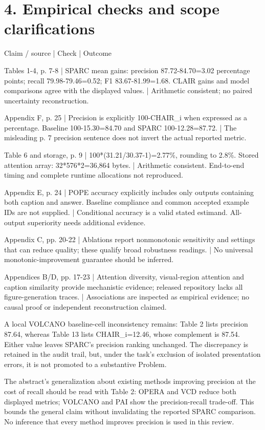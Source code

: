 \documentclass[10pt]{article}
\begin{document}
\section*{4. Empirical checks and scope clarifications}
Claim / source | Check | Outcome\par
Tables 1-4, p. 7-8 | SPARC mean gains: precision 87.72-84.70=3.02 percentage points; recall 79.98-79.46=0.52; F1 83.67-81.99=1.68. CLAIR gains and model comparisons agree with the displayed values. | Arithmetic consistent; no paired uncertainty reconstruction.\par
Appendix F, p. 25 | Precision is explicitly 100-CHAIR\_i when expressed as a percentage. Baseline 100-15.30=84.70 and SPARC 100-12.28=87.72. | The misleading p. 7 precision sentence does not invert the actual reported metric.\par
Table 6 and storage, p. 9 | 100*(31.21/30.37-1)=2.77\%, rounding to 2.8\%. Stored attention array: 32*576*2=36,864 bytes. | Arithmetic consistent. End-to-end timing and complete runtime allocations not reproduced.\par
Appendix E, p. 24 | POPE accuracy explicitly includes only outputs containing both caption and answer. Baseline compliance and common accepted example IDs are not supplied. | Conditional accuracy is a valid stated estimand. All-output superiority needs additional evidence.\par
Appendix C, pp. 20-22 | Ablations report nonmonotonic sensitivity and settings that can reduce quality; these qualify broad robustness readings. | No universal monotonic-improvement guarantee should be inferred.\par
Appendices B/D, pp. 17-23 | Attention diversity, visual-region attention and caption similarity provide mechanistic evidence; released repository lacks all figure-generation traces. | Associations are inspected as empirical evidence; no causal proof or independent reconstruction claimed.\par
A local VOLCANO baseline-cell inconsistency remains: Table 2 lists precision 87.64, whereas Table 13 lists CHAIR\_i=12.46, whose complement is 87.54. Either value leaves SPARC’s precision ranking unchanged. The discrepancy is retained in the audit trail, but, under the task’s exclusion of isolated presentation errors, it is not promoted to a substantive Problem.\par
The abstract’s generalization about existing methods improving precision at the cost of recall should be read with Table 2: OPERA and VCD reduce both displayed metrics; VOLCANO and PAI show the precision-recall trade-off. This bounds the general claim without invalidating the reported SPARC comparison. No inference that every method improves precision is used in this review.\par
\end{document}
